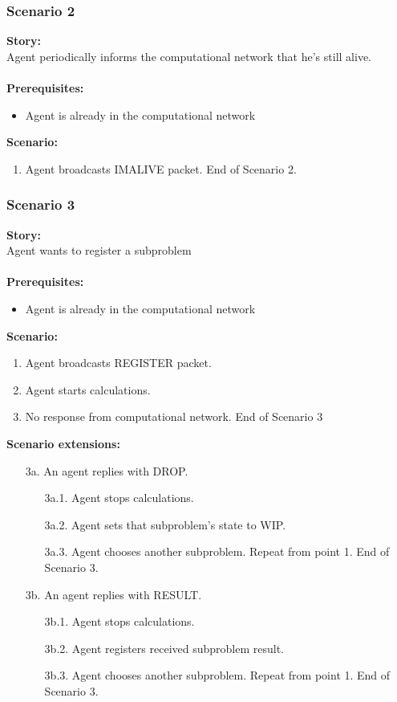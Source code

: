 \documentclass{article}
\begin{document}
\subsubsection{Scenario 2}
\noindent\textbf{Story:} \\
Agent periodically informs the computational network that he's still alive. \\\\
\textbf{Prerequisites:}
\begin{itemize}
    \item Agent is already in the computational network
\end{itemize}
\textbf{Scenario:}
\begin{enumerate}
    \item Agent broadcasts IMALIVE packet. End of Scenario 2.
\end{enumerate}

\subsubsection{Scenario 3}
\noindent\textbf{Story:} \\
Agent wants to register a subproblem \\\\
\textbf{Prerequisites:}
\begin{itemize}
    \item Agent is already in the computational network
\end{itemize}
\textbf{Scenario:}
\begin{enumerate}
    \item Agent broadcasts REGISTER packet.
    \item Agent starts calculations.
    \item No response from computational network. End of Scenario 3
\end{enumerate}
\textbf{Scenario extensions:}
\begin{itemize}
    \item[3a.] An agent replies with DROP.
    \begin{itemize} 
    \item[3a.1.] Agent stops calculations.
    \item[3a.2.] Agent sets that subproblem's state to WIP.
    \item[3a.3.] Agent chooses another subproblem. Repeat from point 1. End of Scenario 3.  
    \end{itemize}
    \item[3b.] An agent replies with RESULT. 
    \begin{itemize} 
    \item[3b.1.] Agent stops calculations.
    \item[3b.2.] Agent registers received subproblem result. 
    \item[3b.3.] Agent chooses another subproblem. Repeat from point 1. End of Scenario 3.  
    \end{itemize}
\end{itemize}
\end{document}
